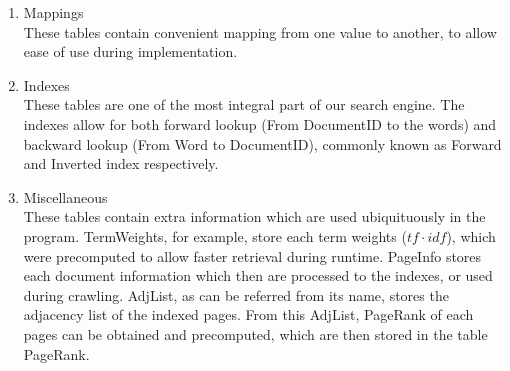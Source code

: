 \documentclass{article}
\begin{document}
    \begin{enumerate}
        \item Mappings \\
        These tables contain convenient mapping from one value to another, to allow ease of use during implementation.
        \item Indexes \\
        These tables are one of the most integral part of our search engine. The indexes allow for both forward lookup (From DocumentID to the words) and backward lookup (From Word to DocumentID), commonly known as Forward and Inverted index respectively.
        \item Miscellaneous \\
        These tables contain extra information which are used ubiquituously in the program. TermWeights, for example, store each term weights ($tf \cdot idf$), which were precomputed to allow faster retrieval during runtime. PageInfo stores each document information which then are processed to the indexes, or used during crawling. AdjList, as can be referred from its name, stores the adjacency list of the indexed pages. From this AdjList, PageRank of each pages can be obtained and precomputed, which are then stored in the table PageRank.
    \end{enumerate}
\end{document}
